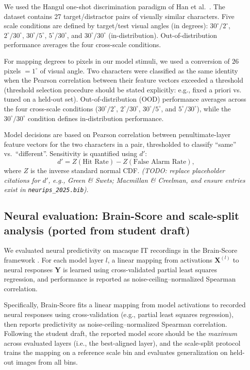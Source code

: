 \documentclass[pdflatex,sn-nature]{sn-jnl}
\begin{document}
We used the Hangul one-shot discrimination paradigm of Han et al.\ \cite{Han2020}. The dataset
contains 27 target/distractor pairs of visually similar characters. Five scale conditions are
defined by target/test visual angles (in degrees): $30^\circ/2^\circ$, $2^\circ/30^\circ$,
$30^\circ/5^\circ$, $5^\circ/30^\circ$, and $30^\circ/30^\circ$ (in-distribution). Out-of-distribution
performance averages the four cross-scale conditions.


For mapping degrees to pixels in our model stimuli, we used a conversion of $26$ pixels $= 1^\circ$ of visual angle.
Two characters were classified as the same identity when the Pearson correlation between their feature vectors exceeded a threshold
(threshold selection procedure should be stated explicitly: e.g., fixed a priori vs. tuned on a held-out set).
Out-of-distribution (OOD) performance averages across the four cross-scale conditions ($30^\circ/2^\circ$, $2^\circ/30^\circ$,
$30^\circ/5^\circ$, and $5^\circ/30^\circ$), while the $30^\circ/30^\circ$ condition defines in-distribution performance.

Model decisions are based on Pearson correlation between penultimate-layer feature vectors for the
two characters in a pair, thresholded to classify “same” vs.\ “different”. Sensitivity is quantified
using $d'$:
\[
d' = Z(\text{Hit Rate}) - Z(\text{False Alarm Rate}),
\]
where $Z$ is the inverse standard normal CDF. \textit{(TODO: replace placeholder citations for $d'$,
e.g., Green \& Swets; Macmillan \& Creelman, and ensure entries exist in \texttt{neurips\_2025.bib}).}

\subsection{Neural evaluation: Brain-Score and scale-split analysis (ported from student draft)}

We evaluated neural predictivity on macaque IT recordings in the Brain-Score framework
\cite{Schrimpf2020-em,Majaj2015-bb}. For each model layer $l$, a linear mapping from activations
$\mathbf{X}^{(l)}$ to neural responses $\mathbf{Y}$ is learned using cross-validated partial least
squares regression, and performance is reported as noise-ceiling--normalized Spearman correlation.

Specifically, Brain-Score fits a linear mapping from model activations to recorded neural responses using cross-validation
(e.g., partial least squares regression), then reports predictivity as noise-ceiling--normalized Spearman correlation.
Following the student draft, the reported model score should be the \emph{maximum} across evaluated layers (i.e., the best-aligned layer),
and the scale-split protocol trains the mapping on a reference scale bin and evaluates generalization on held-out images from all bins.
\end{document}
